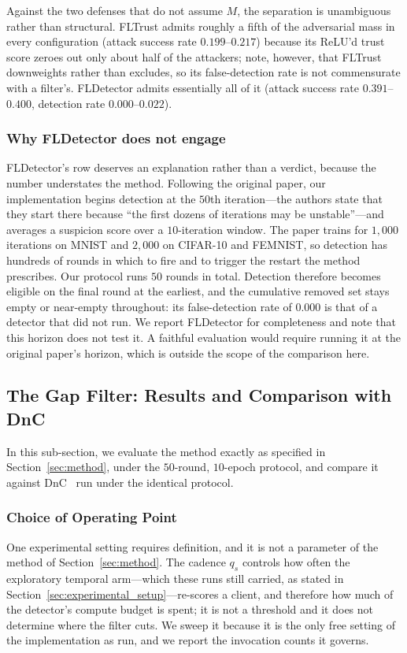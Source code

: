\documentclass[journal]{IEEEtran}
\begin{document}
Against the two defenses that do not assume $M$, the separation is unambiguous rather than
structural. FLTrust admits roughly a fifth of the adversarial mass in every configuration
(attack success rate $0.199$--$0.217$) because its ReLU'd trust score zeroes out only about
half of the attackers; note, however, that FLTrust downweights rather than excludes, so its
false-detection rate is not commensurate with a filter's. FLDetector admits essentially all
of it (attack success rate $0.391$--$0.400$, detection rate $0.000$--$0.022$).

\subsubsection{Why FLDetector does not engage}
FLDetector's row deserves an explanation rather than a verdict, because the number understates
the method. Following the original paper, our implementation begins detection at the $50$th
iteration---the authors state that they start there because ``the first dozens of iterations
may be unstable''---and averages a suspicion score over a $10$-iteration window. The paper
trains for $1{,}000$ iterations on MNIST and $2{,}000$ on CIFAR-10 and FEMNIST, so detection
has hundreds of rounds in which to fire and to trigger the restart the method prescribes. Our
protocol runs $50$ rounds in total. Detection therefore becomes eligible on the final round
at the earliest, and the cumulative removed set stays empty or near-empty throughout: its
false-detection rate of $0.000$ is that of a detector that did not run.
We report FLDetector for completeness and note that this horizon does not test it. A
faithful evaluation would require running it at the original paper's horizon, which is
outside the scope of the comparison here.


\subsection{The Gap Filter: Results and Comparison with DnC}
\label{sec:af_results}

In this sub-section, we evaluate the method exactly as specified in Section~\ref{sec:method}, under the $50$-round, $10$-epoch protocol, and compare it against DnC~\cite{shejwalkar2021manipulating} run under the identical protocol.

\subsubsection{Choice of Operating Point}
One experimental setting requires definition, and it is not a parameter of the method of Section~\ref{sec:method}. The cadence $q_s$ controls how often the exploratory temporal arm---which these runs still carried, as stated in Section~\ref{sec:experimental_setup}---re-scores a client, and therefore how much of the detector's compute budget is spent; it is not a threshold and it does not determine where the filter cuts. We sweep it because it is the only free setting of the implementation as run, and we report the invocation counts it governs.
\end{document}
